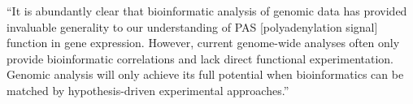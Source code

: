 ``It is abundantly clear that bioinformatic analysis of genomic data has
provided invaluable generality to our understanding of PAS [polyadenylation
signal] function in gene expression. However, current genome-wide analyses
often only provide bioinformatic correlations and lack direct functional
experimentation. Genomic analysis will only achieve its full potential when
bioinformatics can be matched by hypothesis-driven experimental approaches.''


